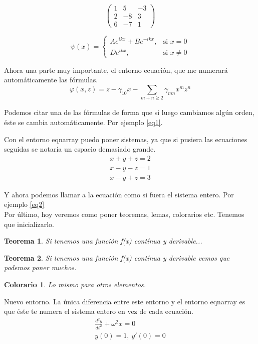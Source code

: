 \documentclass{article}
\newtheorem{teorema}{Teorema}
\newtheorem{colorario}{Colorario}
\begin{document}
$$\left(\begin{matrix}
1&5&-3\\
2&-8&3\\
6&-7&1
\end{matrix}\right)$$

$$
\psi(x)=\begin{cases}
Ae^{ikx}+Be^{-ikx}, &\mbox{si $x=0$}\\
De^{ikx}, &\mbox{si $x\neq 0$}
\end{cases}
$$

Ahora una parte muy importante, el entorno ecuación, que me numerará automáticamente las fórmulas.
\begin{equation}\label{eq1}
\varphi(x,z)=z-\gamma_ {10} x- \sum_ {m+n\geq 2} \gamma_{mn} x^m z^n
\end{equation}

Podemos citar una de las fórmulas de forma que si luego cambiamos algún orden, éste se cambia automáticamente. Por ejemplo \eqref{eq1}.\bigskip

Con el entorno eqnarray puedo poner sistemas, ya que si pusiera las ecuaciones seguidas se notaría un espacio demasiado grande.
\begin{eqnarray}
x+y+z=2\nonumber\\
x-y-z=1\label{eq2}\\
x-y+z=3\nonumber
\end{eqnarray}

Y ahora podemos llamar a la ecuación como si fuera el sistema entero. Por ejemplo \eqref{eq2}
\\ [4mm]
\indent
Por último, hoy veremos como poner teoremas, lemas, colorarios etc. Tenemos que inicializarlo.
\begin{teorema}
Si tenemos una función f(x) contínua y derivable...
\end{teorema}

\begin{teorema}
Si tenemos una función f(x) contínua y derivable vemos que podemos poner muchos.
\end{teorema}

\begin{colorario}
Lo mismo para otros elementos.
\end{colorario}

Nuevo entorno. La única diferencia entre este entorno y el entorno eqnarray es que éste te numera el sistema entero en vez de cada ecuación.
\begin{equation}
\begin{split}
\frac{d^2y}{dt^2}+\omega^2x=0\\
y(0)=1,\ y'(0)=0 %
\end{split}
\end{equation}
\end{document}
